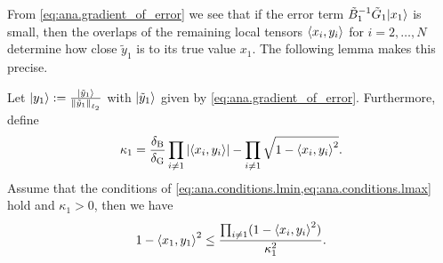 From \cref{eq:ana.gradient_of_error} we see that if the error term $\tilde B_1^{-1} \tilde G_1 \ket{x_1}$ is small, then the overlaps of the remaining local tensors $\braket{x_i, y_i}$ for $i=2,\ldots,N$ determine how close $\tilde y_1$ is to its true value $x_1$.
The following lemma makes this precise.

\begin{lemma}%
  \label{lem:ana.local_error_bound}
  Let $\ket{y_1} := \frac{\ket{\tilde y_1}}{\ltwonorm{\tilde y_1}}$ with $\ket{\tilde y_1}$ given by \cref{eq:ana.gradient_of_error}.
  Furthermore, define
  \[
    \label{eq:ana.local_error_bound.def_kappa}
    \kappa_1 = \frac{\delta_\mathrm{B}}{\delta_\mathrm{G}} \prod_{i \neq 1} {\left\vert\braket{x_i, y_i}\right\vert} - \prod_{i \neq 1} \sqrt{1 - \braket{x_i, y_i}^2}.
  \]
  Assume that the conditions of \cref{eq:ana.conditions.lmin,eq:ana.conditions.lmax} hold and $\kappa_1 > 0$, then we have
  \[
    \label{eq:ana.local_error_bound}
    1 - \Braket{x_1, y_1}^2 \le \frac{\prod_{i \neq 1} (1 - \braket{x_i, y_i}^2)}{\kappa_1^2}.
  \]
\end{lemma}
